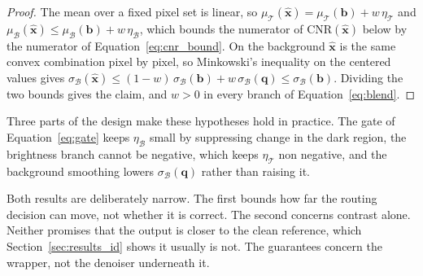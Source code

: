 \begin{proof}
The mean over a fixed pixel set is linear, so
$\mu_\mathcal{T}(\hat{\mathbf{x}}) = \mu_\mathcal{T}(\mathbf{b}) + w\,\eta_\mathcal{T}$ and
$\mu_\mathcal{B}(\hat{\mathbf{x}}) \le \mu_\mathcal{B}(\mathbf{b}) + w\,\eta_\mathcal{B}$, which bounds
the numerator of $\mathrm{CNR}(\hat{\mathbf{x}})$ below by the numerator of
Equation~\eqref{eq:cnr_bound}. On the background $\hat{\mathbf{x}}$ is the same convex combination
pixel by pixel, so Minkowski's inequality on the centered values gives
$\sigma_\mathcal{B}(\hat{\mathbf{x}}) \le (1-w)\,\sigma_\mathcal{B}(\mathbf{b}) + w\,\sigma_\mathcal{B}(\mathbf{q}) \le \sigma_\mathcal{B}(\mathbf{b})$.
Dividing the two bounds gives the claim, and $w > 0$ in every branch of Equation~\eqref{eq:blend}.
\end{proof}


Three parts of the design make these hypotheses hold in practice. The gate of
Equation~\eqref{eq:gate} keeps $\eta_\mathcal{B}$ small by suppressing change in the dark region, the
brightness branch cannot be negative, which keeps $\eta_\mathcal{T}$ non negative, and the background
smoothing lowers $\sigma_\mathcal{B}(\mathbf{q})$ rather than raising it.

Both results are deliberately narrow. The first bounds how far the routing decision can move, not
whether it is correct. The second concerns contrast alone. Neither promises that the output is closer
to the clean reference, which Section~\ref{sec:results_id} shows it usually is not. The guarantees
concern the wrapper, not the denoiser underneath it.
